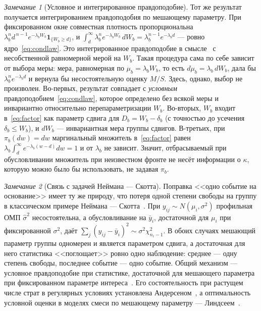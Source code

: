 \documentclass[11pt,a4paper]{article}
\theoremstyle{plain}
\theoremstyle{remark}
\newtheorem{remark}{Замечание}
\begin{document}
\begin{remark}[Условное и интегрированное правдоподобие]\label{rem:integrated}
Тот же результат получается интегрированием правдоподобия по мешающему
параметру. При фиксированном окне совместная плотность пропорциональна
$\lambda_b^{n}d^{\,n-1}e^{-\lambda_bW_b}\mathbf 1_{\{W_b\ge d\}}$, и
$\int_d^\infty\lambda_b^{n}e^{-\lambda_bW_b}\,dW_b=\lambda_b^{n-1}e^{-\lambda_bd}$ ---
ровно ядро~\eqref{eq:condlaw}. Это интегрированное правдоподобие в
смысле~\cite{berger1999} с несобственной равномерной мерой на $W_b$. Такая
процедура сама по себе зависит от выбора меры: мера, равномерная по
$\mu_b=\lambda_bW_b$, то есть $d\mu_b=\lambda_b\,dW_b$, дала бы
$\lambda_b^{n}e^{-\lambda_bd}$ и вернула бы несостоятельную оценку $M/S$. Здесь, однако,
выбор не произволен. Во-первых, результат совпадает с \emph{условным}
правдоподобием~\eqref{eq:condlaw}, которое определено без всякой меры и
инвариантно относительно перепараметризации $W_b$. Во-вторых, $W_b$ входит
в~\eqref{eq:factor} как параметр сдвига для $D_b=W_b-\delta_b$ (с точностью до
усечения $\delta_b\le W_b$), и $dW_b$ ---
инвариантная мера группы сдвигов. В-третьих, при $\pi_b(dw)=dw$ маргинальный
множитель в~\eqref{eq:factor} равен $\lambda_b\int_d^\infty e^{-\lambda_b(w-d)}dw=1$
и от $\lambda_b$ не зависит. Значит, отбрасываемый при обусловливании множитель
при неизвестном фронте не несёт информации о $\kappa$, которую можно было бы
использовать, не задавая $\pi_b$.
\end{remark}

\begin{remark}[Связь с задачей Неймана --- Скотта]\label{rem:neymanscott}
Поправка <<одно событие на основание>> имеет ту же природу, что потеря одной
степени свободы на группу в классическом примере Неймана ---
Скотта~\cite{neymanscott1948}. При $y_{ij}\sim N(\mu_i,\sigma^2)$ профильная ОМП
$\hat\sigma^2$ несостоятельна, а обусловливание на $\bar y_i$, достаточной для
$\mu_i$ при фиксированной $\sigma^2$, даёт
$\sum_j(y_{ij}-\bar y_i)^2\sim\sigma^2\chi^2_{n_i-1}$. В обоих случаях мешающий
параметр группы одномерен и является параметром сдвига, а достаточная для него
статистика <<поглощает>> ровно одно наблюдение: среднее --- одну степень свободы,
последнее событие --- одно событие. Общий механизм --- условное правдоподобие при
статистике, достаточной для мешающего параметра при фиксированном параметре
интереса~\cite{kalbfleischsprott1970}. Его состоятельность при растущем числе
страт в регулярных условиях установлена Андерсеном~\cite{andersen1970}, а
оптимальность условной оценки в моделях смеси по мешающему параметру ---
Линдсеем~\cite{lindsay1980}.
\end{remark}
\end{document}
